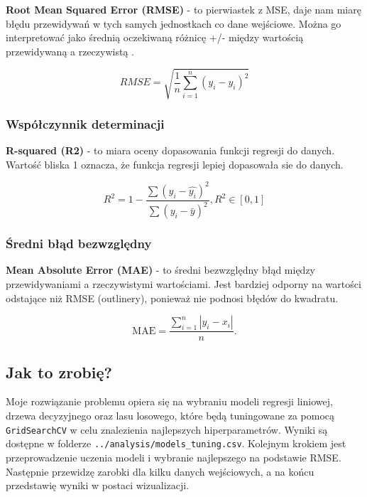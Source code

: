 \documentclass[a4paper]{article}
\begin{document}
\quad \textbf{Root Mean Squared Error (RMSE)} - to pierwiastek z MSE, daje nam miarę błędu przewidywań w tych samych jednostkach co dane wejściowe.
Można go interpretować jako średnią oczekiwaną różnicę +/- między wartością przewidywaną a rzeczywistą \cite{rmse}.

\begin{equation}
    RMSE = \sqrt{\frac{1}{n} \sum_{i=1}^{n} (y_i - \hat{y_i})^2}
\end{equation}

\subsubsection{Współczynnik determinacji}

\quad \textbf{R-squared (R2)} - to miara oceny dopasowania funkcji regresji do danych. Wartość bliska 1 oznacza, że funkcja regresji lepiej dopasowała sie do danych.

\begin{equation} R^2=1-\frac{\sum({y_i}-\hat{y_i})^2}{\sum(y_i-\bar{y})^2}, R^2 \in [0, 1] \end{equation}

\subsubsection{Średni błąd bezwzględny}

\quad \textbf{Mean Absolute Error (MAE)} - to średni bezwzględny błąd między przewidywaniami a rzeczywistymi wartościami.
Jest bardziej odporny na wartości odstające niż RMSE (outlinery), ponieważ nie podnosi błędów do kwadratu.

\begin{equation}
    {\displaystyle \mathrm {MAE} ={\frac {\sum _{i=1}^{n}\left|y_{i}-x_{i}\right|}{n}}.}
\end{equation}


\subsection{Jak to zrobię?}

\quad Moje rozwiązanie problemu opiera się na wybraniu modeli regresji liniowej, drzewa decyzyjnego oraz lasu losowego, które będą
tuningowane za pomocą \texttt{GridSearchCV} w celu znalezienia najlepszych hiperparametrów. Wyniki są dostępne w folderze
\texttt{../analysis/models\_tuning.csv}. Kolejnym krokiem jest przeprowadzenie uczenia modeli i wybranie najlepszego
na podstawie RMSE. Następnie przewidzę zarobki dla kilku danych wejściowych, a na końcu przedstawię wyniki w postaci wizualizacji.\\
\end{document}
